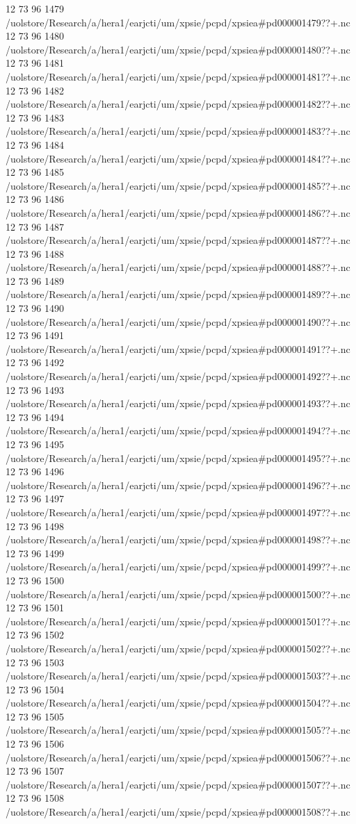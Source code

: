 12 73 96
1479
/uolstore/Research/a/hera1/earjcti/um/xpsie/pcpd/xpsiea#pd000001479??+.nc
12 73 96
1480
/uolstore/Research/a/hera1/earjcti/um/xpsie/pcpd/xpsiea#pd000001480??+.nc
12 73 96
1481
/uolstore/Research/a/hera1/earjcti/um/xpsie/pcpd/xpsiea#pd000001481??+.nc
12 73 96
1482
/uolstore/Research/a/hera1/earjcti/um/xpsie/pcpd/xpsiea#pd000001482??+.nc
12 73 96
1483
/uolstore/Research/a/hera1/earjcti/um/xpsie/pcpd/xpsiea#pd000001483??+.nc
12 73 96
1484
/uolstore/Research/a/hera1/earjcti/um/xpsie/pcpd/xpsiea#pd000001484??+.nc
12 73 96
1485
/uolstore/Research/a/hera1/earjcti/um/xpsie/pcpd/xpsiea#pd000001485??+.nc
12 73 96
1486
/uolstore/Research/a/hera1/earjcti/um/xpsie/pcpd/xpsiea#pd000001486??+.nc
12 73 96
1487
/uolstore/Research/a/hera1/earjcti/um/xpsie/pcpd/xpsiea#pd000001487??+.nc
12 73 96
1488
/uolstore/Research/a/hera1/earjcti/um/xpsie/pcpd/xpsiea#pd000001488??+.nc
12 73 96
1489
/uolstore/Research/a/hera1/earjcti/um/xpsie/pcpd/xpsiea#pd000001489??+.nc
12 73 96
1490
/uolstore/Research/a/hera1/earjcti/um/xpsie/pcpd/xpsiea#pd000001490??+.nc
12 73 96
1491
/uolstore/Research/a/hera1/earjcti/um/xpsie/pcpd/xpsiea#pd000001491??+.nc
12 73 96
1492
/uolstore/Research/a/hera1/earjcti/um/xpsie/pcpd/xpsiea#pd000001492??+.nc
12 73 96
1493
/uolstore/Research/a/hera1/earjcti/um/xpsie/pcpd/xpsiea#pd000001493??+.nc
12 73 96
1494
/uolstore/Research/a/hera1/earjcti/um/xpsie/pcpd/xpsiea#pd000001494??+.nc
12 73 96
1495
/uolstore/Research/a/hera1/earjcti/um/xpsie/pcpd/xpsiea#pd000001495??+.nc
12 73 96
1496
/uolstore/Research/a/hera1/earjcti/um/xpsie/pcpd/xpsiea#pd000001496??+.nc
12 73 96
1497
/uolstore/Research/a/hera1/earjcti/um/xpsie/pcpd/xpsiea#pd000001497??+.nc
12 73 96
1498
/uolstore/Research/a/hera1/earjcti/um/xpsie/pcpd/xpsiea#pd000001498??+.nc
12 73 96
1499
/uolstore/Research/a/hera1/earjcti/um/xpsie/pcpd/xpsiea#pd000001499??+.nc
12 73 96
1500
/uolstore/Research/a/hera1/earjcti/um/xpsie/pcpd/xpsiea#pd000001500??+.nc
12 73 96
1501
/uolstore/Research/a/hera1/earjcti/um/xpsie/pcpd/xpsiea#pd000001501??+.nc
12 73 96
1502
/uolstore/Research/a/hera1/earjcti/um/xpsie/pcpd/xpsiea#pd000001502??+.nc
12 73 96
1503
/uolstore/Research/a/hera1/earjcti/um/xpsie/pcpd/xpsiea#pd000001503??+.nc
12 73 96
1504
/uolstore/Research/a/hera1/earjcti/um/xpsie/pcpd/xpsiea#pd000001504??+.nc
12 73 96
1505
/uolstore/Research/a/hera1/earjcti/um/xpsie/pcpd/xpsiea#pd000001505??+.nc
12 73 96
1506
/uolstore/Research/a/hera1/earjcti/um/xpsie/pcpd/xpsiea#pd000001506??+.nc
12 73 96
1507
/uolstore/Research/a/hera1/earjcti/um/xpsie/pcpd/xpsiea#pd000001507??+.nc
12 73 96
1508
/uolstore/Research/a/hera1/earjcti/um/xpsie/pcpd/xpsiea#pd000001508??+.nc
